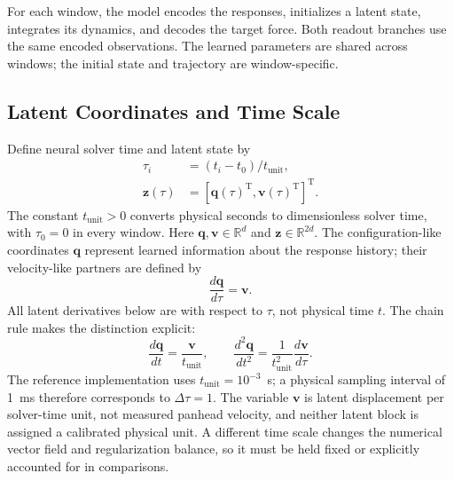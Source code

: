\documentclass[journal,twoside]{IEEEtran}
\begin{document}
For each window, the model encodes the responses, initializes a latent
state, integrates its dynamics, and decodes the target force. Both readout
branches use the same encoded observations. The learned parameters are
shared across windows; the initial state and trajectory are window-specific.

\subsection{Latent Coordinates and Time Scale}
Define neural solver time and latent state by
\begin{equation}
\begin{aligned}
    \tau_i&=(t_i-t_0)/t_{\mathrm{unit}},\\
    \mathbf z(\tau)&=[\mathbf q(\tau)^{\mathrm T},
                      \mathbf v(\tau)^{\mathrm T}]^{\mathrm T}.
\end{aligned}
\label{eq:latent_state}
\end{equation}
The constant $t_{\mathrm{unit}}>0$ converts physical seconds to
dimensionless solver time, with $\tau_0=0$ in every window.
Here $\mathbf q,\mathbf v\in\mathbb R^d$ and
$\mathbf z\in\mathbb R^{2d}$. The configuration-like coordinates
$\mathbf q$ represent learned information about the response history;
their velocity-like partners are defined by
\begin{equation}
    \frac{d\mathbf q}{d\tau}=\mathbf v.
    \label{eq:latent_kinematics}
\end{equation}
All latent derivatives below are with respect to $\tau$, not physical
time $t$. The chain rule makes the distinction explicit:
\begin{equation}
    \frac{d\mathbf q}{dt}=\frac{\mathbf v}{t_{\mathrm{unit}}},
    \qquad
    \frac{d^2\mathbf q}{dt^2}=
    \frac{1}{t_{\mathrm{unit}}^2}\frac{d\mathbf v}{d\tau}.
    \label{eq:time_conversion}
\end{equation}
The reference implementation uses $t_{\mathrm{unit}}=10^{-3}$~s; a
physical sampling interval of 1~ms therefore corresponds to
$\Delta\tau=1$. The variable $\mathbf v$ is latent displacement per
solver-time unit, not measured panhead velocity, and neither latent block
is assigned a calibrated physical unit. A different time scale changes
the numerical vector field and regularization balance, so it must be held
fixed or explicitly accounted for in comparisons.
\end{document}
